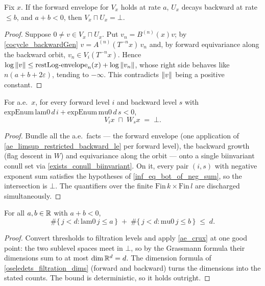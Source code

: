 \begin{proposition}\label{inf_eq_bot_of_neg_sum}
  \leanok
  Fix \(x\). If the forward envelope for \(V_x\) holds at rate \(a\), \(U_x\) decays backward at rate \(\le b\), and \(a + b < 0\), then \(V_x \sqcap U_x = \bot\).
\end{proposition}
\begin{proof}\leanok
  Suppose \(0 \neq v \in V_x \sqcap U_x\). Put \(v_n = B^{(n)}(x)v\); by \cref{cocycle_backwardGen} \(v = A^{(n)}(T^{-n}x)\,v_n\) and, by forward equivariance along the backward orbit, \(v_n \in V_i(T^{-n}x)\). Hence \(\log\left\lVert v \right\rVert \le \mathrm{restLog}\text{-envelope}_n(x) + \log\left\lVert v_n \right\rVert\), whose right side behaves like \(n(a + b + 2\varepsilon)\), tending to \(-\infty\). This contradicts \(\left\lVert v \right\rVert\) being a positive constant.
\end{proof}

\begin{proposition}\label{ae_crux}
  \leanok
  For a.e.\ \(x\), for every forward level \(i\) and backward level \(s\) with \(\mathrm{expEnum}\,\mathrm{lam0}\,d\,i + \mathrm{expEnum}\,\mathrm{mu0}\,d\,s < 0\),
  \[
    V_{i}x \;\sqcap\; W_{s}x \;=\; \bot.
  \]
\end{proposition}
\begin{proof}\leanok
  Bundle all the a.e.\ facts — the forward envelope (one application of \cref{ae_limsup_restricted_backward_le} per forward level), the backward growth (flag descent in \(W\)) and equivariance along the orbit — onto a single biinvariant conull set via \cref{exists_conull_biinvariant}. On it, every pair \((i,s)\) with negative exponent sum satisfies the hypotheses of \cref{inf_eq_bot_of_neg_sum}, so the intersection is \(\bot\). The quantifiers over the finite \(\mathrm{Fin}\,k \times \mathrm{Fin}\,l\) are discharged simultaneously.
\end{proof}

\begin{corollary}\label{ae_counting}
  \leanok
  For all \(a, b \in \mathbb{R}\) with \(a + b < 0\),
  \[
    \#\{\, j < d : \mathrm{lam0}\,j \le a \,\} \;+\; \#\{\, j < d : \mathrm{mu0}\,j \le b \,\} \;\le\; d.
  \]
\end{corollary}
\begin{proof}\leanok
  Convert thresholds to filtration levels and apply \cref{ae_crux} at one good point: the two sublevel spaces meet in \(\bot\), so by the Grassmann formula their dimensions sum to at most \(\dim \mathbb{R}^d = d\). The dimension formula of \cref{oseledets_filtration_dims} (forward and backward) turns the dimensions into the stated counts. The bound is deterministic, so it holds outright.
\end{proof}

